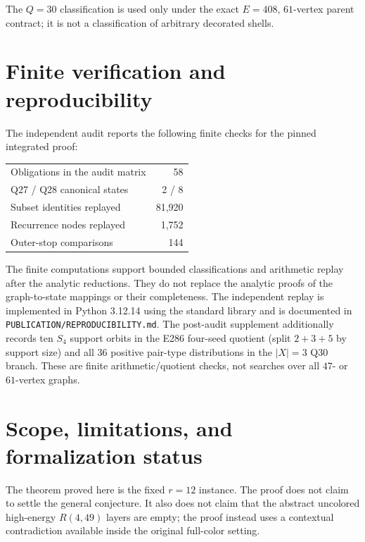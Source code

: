 \documentclass[11pt]{article}
\theoremstyle{definition}
\theoremstyle{remark}
\begin{document}
The $Q=30$ classification is used only under the exact $E=408$,
$61$-vertex parent contract; it is not a classification of arbitrary
decorated shells.

\section{Finite verification and reproducibility}
\label{sec:computation}

The independent audit reports the following finite checks for the pinned
integrated proof:

\begin{center}
\begin{tabular}{lr}
\hline
Obligations in the audit matrix & 58\\
Q27 / Q28 canonical states & 2 / 8\\
Subset identities replayed & 81,920\\
Recurrence nodes replayed & 1,752\\
Outer-stop comparisons & 144\\
\hline
\end{tabular}
\end{center}

The finite computations support bounded classifications and arithmetic
replay after the analytic reductions. They do not replace the analytic
proofs of the graph-to-state mappings or their completeness. The independent
replay is implemented in Python 3.12.14 using the standard library and is
documented in \texttt{PUBLICATION/REPRODUCIBILITY.md}. The post-audit
supplement additionally records ten $S_4$ support orbits in the E286
four-seed quotient (split $2+3+5$ by support size) and all $36$ positive
pair-type distributions in the $|X|=3$ Q30 branch. These are finite
arithmetic/quotient checks, not searches over all $47$- or $61$-vertex
graphs.

\section{Scope, limitations, and formalization status}

The theorem proved here is the fixed $r=12$ instance. The proof does not
claim to settle the general conjecture. It also does not claim that the
abstract uncolored high-energy $R(4,49)$ layers are empty; the proof instead
uses a contextual contradiction available inside the original full-color
setting.
\end{document}
